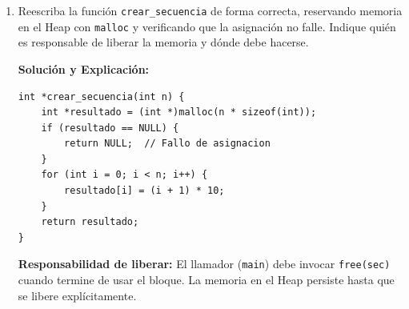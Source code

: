 \documentclass[11pt,letterpaper]{article}
\begin{document}
\begin{enumerate}[label=\textbf{\arabic*.}]
\begin{enumerate}[label=(\alph*)]
        \begin{solucionbox}
        \textbf{Solución y Explicación:}

        \noindent \textbf{Error 1 -- Retorno de puntero a variable local (\textit{dangling pointer}):}
        El arreglo \texttt{resultado} es un VLA que vive en el Stack Frame de \texttt{crear\_secuencia}. Cuando la función retorna, su Stack Frame se destruye y la memoria queda invalidada. El puntero devuelto produce \textit{undefined behavior} al desreferenciarlo.

        \noindent \textbf{Error 2 -- \texttt{free} sobre memoria no dinámica:}
        La función \texttt{free} solo acepta punteros obtenidos mediante \texttt{malloc}, \texttt{calloc} o \texttt{realloc}. Llamar a \texttt{free(sec)} con un puntero al Stack provoca corrupción del Heap o \textit{Segmentation Fault}.
        \end{solucionbox}

        \vspace{0.3cm}
        \item Reescriba la función \texttt{crear\_secuencia} de forma correcta, reservando memoria en el Heap con \texttt{malloc} y verificando que la asignación no falle. Indique quién es responsable de liberar la memoria y dónde debe hacerse.

        \begin{solucionbox}
        \textbf{Solución y Explicación:}

        \begin{lstlisting}[style=customc]
int *crear_secuencia(int n) {
    int *resultado = (int *)malloc(n * sizeof(int));
    if (resultado == NULL) {
        return NULL;  // Fallo de asignacion
    }
    for (int i = 0; i < n; i++) {
        resultado[i] = (i + 1) * 10;
    }
    return resultado;
}
        \end{lstlisting}
        \noindent \textbf{Responsabilidad de liberar:} El llamador (\texttt{main}) debe invocar \texttt{free(sec)} cuando termine de usar el bloque. La memoria en el Heap persiste hasta que se libere explícitamente.
        \end{solucionbox}
    \end{enumerate}


\end{enumerate}
\end{document}
